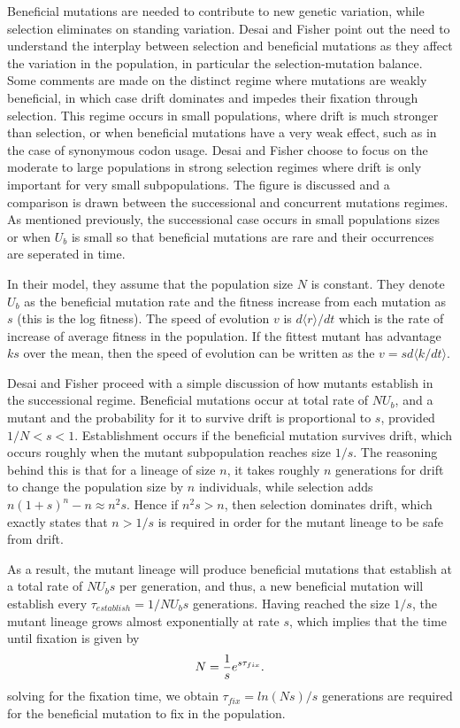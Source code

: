\documentclass[12pt]{article}
\begin{document}
Beneficial mutations are needed to contribute to new genetic variation, while selection eliminates on standing variation.  Desai and Fisher point out the need to understand the interplay between selection and beneficial mutations as they affect the variation in the population, in particular the selection-mutation balance.  Some comments are made on the distinct regime where mutations are weakly beneficial, in which case drift dominates and impedes their fixation through selection.  This regime occurs in small populations, where drift is much stronger than selection, or when beneficial mutations have a very weak effect, such as in the case of synonymous codon usage.  Desai and Fisher choose to focus on the moderate to large populations in strong selection regimes where drift is only important for very small subpopulations.  The figure is discussed and a comparison is drawn between the successional and concurrent mutations regimes.  As mentioned previously, the successional case occurs in small populations sizes or when $U_b$ is small so that beneficial mutations are rare and their occurrences are seperated in time.

In their model, they assume that the population size $N$ is constant.  They denote $U_b$ as the beneficial mutation rate and the fitness increase from each   mutation as $s$ (this is the log fitness).  The speed of evolution $v$ is $d\langle r \rangle / dt$ which is the rate of increase of average fitness in the population.  If the fittest mutant has advantage $ks$ over the mean, then the speed of evolution can be written as the $v=sd\langle k  / dt \rangle$.  

Desai and Fisher proceed with a simple discussion of how mutants establish in the successional regime.  Beneficial mutations occur at total rate of $NU_b$, and a mutant and the probability for it to survive drift is proportional to $s$, provided $1/N<s<1$.  Establishment occurs if the beneficial mutation survives drift, which occurs roughly when the mutant subpopulation reaches size $1/s$.  The reasoning behind this is that for a lineage of size $n$, it takes roughly $n$ generations for drift to change the population size by $n$ individuals, while selection adds $n(1+s)^n-n \approx n^2s$.  Hence if $n^2s>n$, then selection dominates drift, which exactly states that $n>1/s$ is required in order for the mutant lineage to be safe from drift. 

As a result, the mutant lineage will produce beneficial mutations that establish at a total rate of $NU_bs$ per generation, and thus, a new beneficial mutation will establish every $\tau_{establish} = 1/NU_bs$ generations.  Having reached the size $1/s$, the mutant lineage grows almost exponentially at rate $s$, which implies that the time until fixation is given by
\[
N={1 \over s}e^{s \tau_{fix}}.
\]
solving for the fixation time, we obtain $\tau_{fix}=ln(Ns)/s$ generations are required for the beneficial mutation to fix in the population.  
\end{document}
